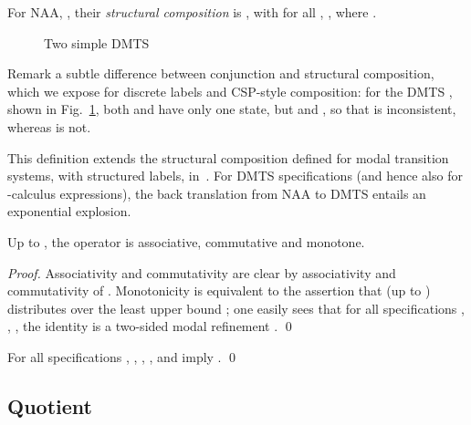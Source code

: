 \documentclass[twocolumn]{svjour3-dummy}
\newcommand*\NAA{NAA\xspace}
\newcommand*\noproof{\qed}
\begin{document}
For \NAA , ,
their \emph{structural composition} is , with  for all ,
, where  .

\begin{figure}
  \centering
  \caption{\label{fi:conjvscomp}
    Two simple DMTS}
\end{figure}

Remark a subtle difference between conjunction and structural
composition, which we expose for discrete labels and CSP-style
composition: for the DMTS ,  shown in
Fig.~\ref{fi:conjvscomp}, both  and 
have only one state, but  and , so that  is inconsistent,
whereas  is not.

This definition extends the structural composition defined for modal
transition systems, with structured labels,
in~\cite{DBLP:journals/acta/FahrenbergL14}.  For DMTS specifications
(and hence also for -calculus expressions), the back translation
from \NAA to DMTS entails an exponential explosion.

\begin{theorem}
  \label{th:comp}
  Up to , the operator  is associative, commutative and
  monotone.
\end{theorem}

\begin{proof}Associativity and commutativity are clear by associativity and
  commutativity of .  Monotonicity is equivalent to the assertion
  that (up to )  distributes over the least upper bound
  ; one easily sees that for all specifications , ,
  , the identity is a two-sided modal refinement .  \qed
\end{proof}

\begin{corollary}
  \label{co:indimp}
  For all specifications , , , ,  and  imply .
  \noproof
\end{corollary}

\subsection{Quotient}
\label{se:quot}
\end{document}
